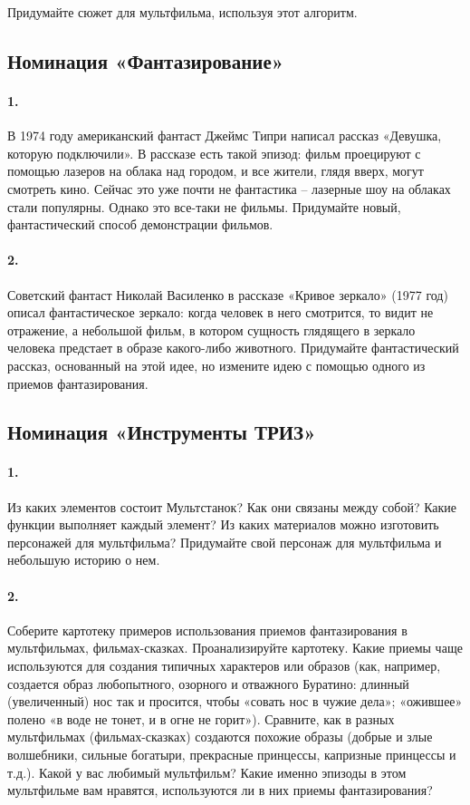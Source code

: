\documentclass[11pt,a4paper]{article}
\begin{document}
Придумайте сюжет для мультфильма, используя этот алгоритм.

\subsection*{Номинация «Фантазирование»}

\paragraph{1.}
В 1974 году американский фантаст Джеймс Типри написал рассказ «Девушка,
которую подключили». В рассказе есть такой эпизод: фильм проецируют с помощью
лазеров на облака над городом, и все жители, глядя вверх, могут смотреть
кино. Сейчас это уже почти не фантастика – лазерные шоу на облаках стали
популярны. Однако это все-таки не фильмы. Придумайте новый, фантастический
способ демонстрации фильмов.

\paragraph{2.}
Советский фантаст Николай Василенко в рассказе «Кривое зеркало» (1977 год)
описал фантастическое зеркало: когда человек в него смотрится, то видит не
отражение, а небольшой фильм, в котором сущность глядящего в зеркало человека
предстает в образе какого-либо животного. Придумайте фантастический рассказ,
основанный на этой идее, но измените идею с помощью одного из приемов
фантазирования.

\subsection*{Номинация «Инструменты ТРИЗ»}

\paragraph{1.}
Из каких элементов состоит Мультстанок? Как они связаны между собой? Какие
функции выполняет каждый элемент? Из каких материалов можно изготовить
персонажей для мультфильма? Придумайте свой персонаж для мультфильма и
небольшую историю о нем.

\paragraph{2.}
Соберите картотеку примеров использования приемов фантазирования в
мультфильмах, фильмах-сказках. Проанализируйте картотеку. Какие приемы чаще
используются для создания типичных характеров или образов (как, например,
создается образ любопытного, озорного и отважного Буратино: длинный
(увеличенный) нос так и просится, чтобы «совать нос в чужие дела»; «ожившее»
полено «в воде не тонет, и в огне не горит»). Сравните, как в разных
мультфильмах (фильмах-сказках) создаются похожие образы (добрые и злые
волшебники, сильные богатыри, прекрасные принцессы, капризные принцессы и
т.д.). Какой у вас любимый мультфильм? Какие именно эпизоды в этом
мультфильме вам нравятся, используются ли в них приемы фантазирования?
\end{document}
